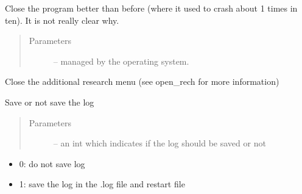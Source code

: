 \documentclass[letterpaper,10pt,english]{sphinxmanual}
\begin{document}
\begin{fulllineitems}
\begin{fulllineitems}
\end{fulllineitems}


\begin{fulllineitems}
\label{\detokenize{index:src_GUI.Main_windows_1.MainWindows.closeEvent}}
Close the program better than before (where it used to crash about 1 times in ten). It is not really clear why.
\begin{quote}\begin{description}
\item[{Parameters}] \leavevmode
{} -- managed by the operating system.

\end{description}\end{quote}

\end{fulllineitems}


\begin{fulllineitems}
\label{\detokenize{index:src_GUI.Main_windows_1.MainWindows.close_rech}}
Close the additional research menu (see open\_rech for more information)

\end{fulllineitems}


\begin{fulllineitems}
\label{\detokenize{index:src_GUI.Main_windows_1.MainWindows.do_log}}
Save or not save the log
\begin{quote}\begin{description}
\item[{Parameters}] \leavevmode
{} -- an int which indicates if the log should be saved or not

\end{description}\end{quote}
\begin{itemize}
\item {} 
0: do not save log

\item {} 
1: save the log in the .log file and restart file


\end{itemize}
\end{fulllineitems}
\end{fulllineitems}
\end{document}
